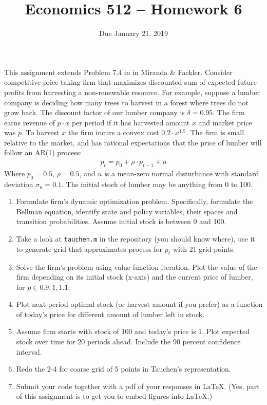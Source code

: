 \documentclass[11pt]{article}
\begin{document}
\onehalfspace

\title{Economics 512 -- Homework 6}
\author{Due January 21, 2019}
\date{}
\maketitle
This assignment extends Problem 7.4 in in Miranda \& Fackler. 
Consider competitive price-taking firm that maximizes discounted sum of expected future profits from harvesting a non-renewable resource. 
For example, suppose a lumber company is deciding how many trees to harvest in a forest where trees do not grow back. 
The discount factor of our lumber company is $\delta = 0.95$. The firm earns revenue of $p\cdot x$ per period if it has harvested amount $x$ and market price was $p$. To harvest $x$ the firm incurs a convex cost $0.2\cdot x^{1.5}$. The firm is small relative to the market, and has rational expectations that the price of lumber
will follow an AR(1) process: 
\begin{align}
p_t = p_0 + \rho\cdot p_{t-1} + u
\end{align}
Where $p_0 = 0.5$, $\rho = 0.5$, and $u$ is a mean-zero normal disturbance with standard deviation $\sigma_u=0.1$.
The initial stock of lumber may be anything from 0 to 100.
\begin{enumerate}
\item Formulate firm's dynamic optimization problem. Specifically, formulate the Bellman equation, identify state and policy variables, their spaces and transition probabilities. Assume initial stock is between 0 and 100.
\item Take a look at {\tt tauchen.m} in the repository (you should know where), use it to generate grid that approximates process for $p_t$ with 21 grid points. 
\item Solve the firm's problem using value function iteration. Plot the value of the firm depending on its initial stock (x-axis) and the current price of lumber, for $p \in{0.9, 1, 1.1}$.
\item Plot next period optimal stock (or harvest amount if you prefer) as a function of today's price for different amount of lumber left in stock.
\item Assume firm starts with stock of 100 and today's price is 1. Plot expected stock over time for 20 periods ahead. Include the 90 percent confidence interval. 
\item Redo the 2-4 for coarse grid of 5 points in Tauchen's representation.
\item Submit your code together with a pdf of your responses in \LaTeX. (Yes, part of this assignment is to get you to embed figures into \LaTeX.)
\end{enumerate}
\end{document}
